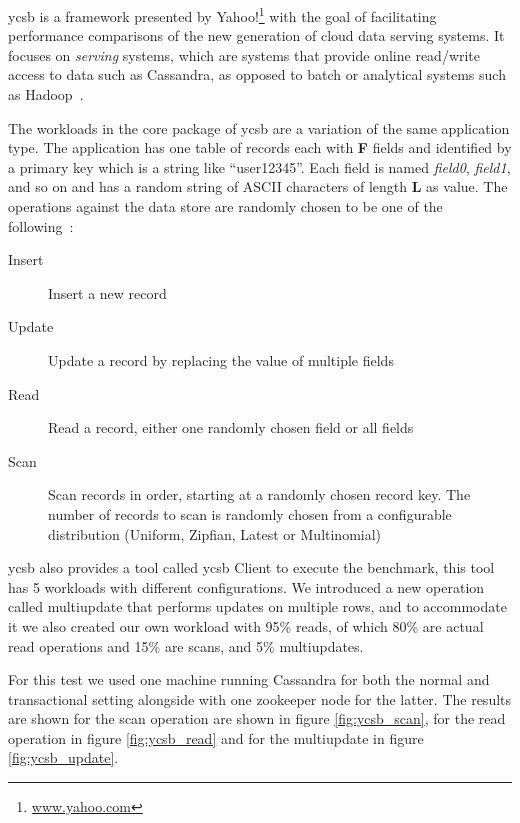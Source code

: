 \ac{ycsb} is a framework presented by Yahoo!\footnote{\url{www.yahoo.com}} with the goal of facilitating performance comparisons of the new generation of cloud data serving systems. It focuses on \emph{serving} systems, which are systems that provide online read/write access to data such as Cassandra, as opposed to batch or analytical systems such as Hadoop~\cite{Cooper:2010:BCS:1807128.1807152}.

The workloads in the core package of \ac{ycsb} are a variation of the same application type. The application has one table of records each with \textbf{F} fields and identified by a primary key which is a string like ``user12345''. Each field is named \emph{field0}, \emph{field1}, and so on and has a random string of ASCII characters of length \textbf{L} as value. The operations against the data store are randomly chosen to be one of the following~\cite{Cooper:2010:BCS:1807128.1807152}:

\begin{description}
	\item[Insert] Insert a new record
	\item[Update] Update a record by replacing the value of multiple fields
	\item[Read] Read a record, either one randomly chosen field or all fields
	\item[Scan] Scan records in order, starting at a randomly chosen record key. The number of records to scan is randomly chosen from a configurable distribution (Uniform, Zipfian, Latest or Multinomial)
\end{description}

\ac{ycsb} also provides a tool called \ac{ycsb} Client to execute the benchmark, this tool has 5 workloads with different configurations. We introduced a new operation called multiupdate that performs updates on multiple rows, and to accommodate it we also created our own workload with 95\% reads, of which 80\% are actual read operations and 15\% are scans, and 5\% multiupdates.

For this test we used one machine running Cassandra for both the normal and transactional setting alongside with one zookeeper node for the latter. The results are shown for the scan operation are shown in figure \ref{fig:ycsb_scan}, for the read operation in figure \ref{fig:ycsb_read} and for the multiupdate in figure \ref{fig:ycsb_update}.


